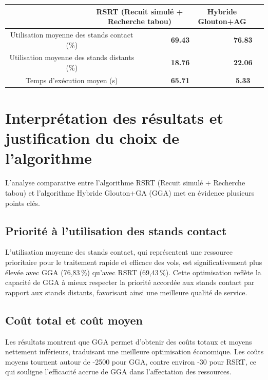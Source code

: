 \begin{table}[htbp]
{\begin{tabular}{|c|c|c|c|c|c|c|c|}
			& \multicolumn{3}{c|}{\textbf{RSRT (Recuit simulé + Recherche tabou)}} 
			& \multicolumn{3}{c|}{\textbf{Hybride Glouton+AG}} \\
			\hline
			\multicolumn{2}{|c|}{Utilisation moyenne des stands contact (\%)} 
			& \multicolumn{3}{c|}{\textbf{69.43}} 
			& \multicolumn{3}{c|}{\textbf{76.83}} \\
			\multicolumn{2}{|c|}{Utilisation moyenne des stands distants (\%)} 
			& \multicolumn{3}{c|}{\textbf{18.76}} 
			& \multicolumn{3}{c|}{\textbf{22.06}} \\
			\multicolumn{2}{|c|}{Temps d’exécution moyen (s)} 
			& \multicolumn{3}{c|}{\textbf{65.71}} 
			& \multicolumn{3}{c|}{\textbf{5.33}} \\
			\hline
		\end{tabular}
	}
\end{table}

\section{Interprétation des résultats et justification du choix de l’algorithme}

L’analyse comparative entre l’algorithme RSRT (Recuit simulé + Recherche tabou) et l’algorithme Hybride Glouton+GA (GGA) met en évidence plusieurs points clés.

\subsection{Priorité à l’utilisation des stands contact}

L’utilisation moyenne des stands contact, qui représentent une ressource prioritaire pour le traitement rapide et efficace des vols, est significativement plus élevée avec GGA (76,83\,\%) qu’avec RSRT (69,43\,\%). Cette optimisation reflète la capacité de GGA à mieux respecter la priorité accordée aux stands contact par rapport aux stands distants, favorisant ainsi une meilleure qualité de service.

\subsection{Coût total et coût moyen}

Les résultats montrent que GGA permet d’obtenir des coûts totaux et moyens nettement inférieurs, traduisant une meilleure optimisation économique. Les coûts moyens tournent autour de -2500 pour GGA, contre environ -30 pour RSRT, ce qui souligne l’efficacité accrue de GGA dans l’affectation des ressources.

